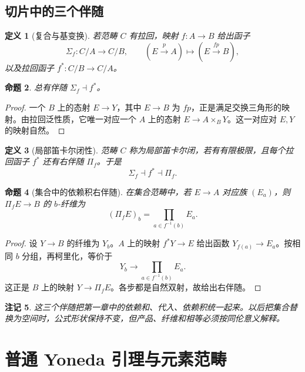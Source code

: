 \documentclass[12pt,oneside,openany,fontset=none]{ctexbook}
\theoremstyle{cn}
\newtheorem{definition}{定义}[chapter]
\newtheorem{proposition}[definition]{命题}
\newtheorem{remark}[definition]{注记}
\numberwithin{equation}{chapter}
\begin{document}
\section{切片中的三个伴随}
\begin{definition}[复合与基变换]
若范畴 $C$ 有拉回，映射 $f:A\to B$ 给出函子
\[
\Sigma_f:C/A\to C/B,
\qquad (E\xrightarrow pA)\mapsto(E\xrightarrow{fp}B),
\]
以及拉回函子 $f^*:C/B\to C/A$。
\end{definition}
\begin{proposition}
总有伴随 $\Sigma_f\dashv f^*$。
\end{proposition}
\begin{proof}
一个 $B$ 上的态射 $E\to Y$，其中 $E\to B$ 为 $fp$，正是满足交换三角形的映射。由拉回泛性质，它唯一对应一个 $A$ 上的态射 $E\to A\times_BY$。这一对应对 $E,Y$ 的映射自然。
\end{proof}
\begin{definition}[局部笛卡尔闭性]
范畴 $C$ 称为局部笛卡尔闭，若有有限极限，且每个拉回函子 $f^*$ 还有右伴随 $\Pi_f$。于是
\[
\Sigma_f\dashv f^*\dashv\Pi_f.
\]
\end{definition}
\begin{proposition}[集合中的依赖积右伴随]
在集合范畴中，若 $E\to A$ 对应族 $(E_a)$，则 $\Pi_fE\to B$ 的 $b$-纤维为
\[
(\Pi_fE)_b=\prod_{a\in f^{-1}(b)}E_a.
\]
\end{proposition}
\begin{proof}
设 $Y\to B$ 的纤维为 $Y_b$。$A$ 上的映射 $f^*Y\to E$ 给出函数 $Y_{f(a)}\to E_a$。按相同 $b$ 分组，再柯里化，等价于
\[
Y_b\to\prod_{a\in f^{-1}(b)}E_a.
\]
这正是 $B$ 上的映射 $Y\to\Pi_fE$。各步都是自然双射，故给出右伴随。
\end{proof}
\begin{remark}
这三个伴随把第一章中的依赖和、代入、依赖积统一起来。以后把集合替换为空间时，公式形状保持不变，但产品、纤维和相等必须按同伦意义解释。
\end{remark}



\chapter{普通 Yoneda 引理与元素范畴}
\end{document}

